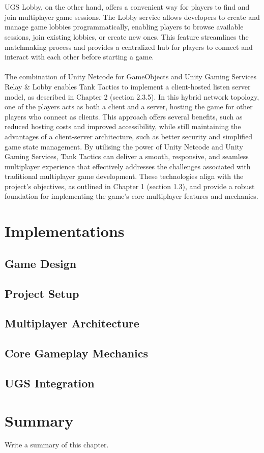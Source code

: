 \\
\noindent
\\
UGS Lobby, on the other hand, offers a convenient way for players to find and join multiplayer game sessions. The Lobby service allows developers to create and manage game lobbies programmatically, enabling players to browse available sessions, join existing lobbies, or create new ones. This feature streamlines the matchmaking process and provides a centralized hub for players to connect and interact with each other before starting a game.
\\
\noindent
\\
The combination of Unity Netcode for GameObjects and Unity Gaming Services Relay \& Lobby enables Tank Tactics to implement a client-hosted listen server model, as described in Chapter 2 (section 2.3.5). In this hybrid network topology, one of the players acts as both a client and a server, hosting the game for other players who connect as clients. This approach offers several benefits, such as reduced hosting costs and improved accessibility, while still maintaining the advantages of a client-server architecture, such as better security and simplified game state management. By utilising the power of Unity Netcode and Unity Gaming Services, Tank Tactics can deliver a smooth, responsive, and seamless multiplayer experience that effectively addresses the challenges associated with traditional multiplayer game development. These technologies align with the project's objectives, as outlined in Chapter 1 (section 1.3), and provide a robust foundation for implementing the game's core multiplayer features and mechanics.

\section{Implementations}

\subsection{Game Design}

\subsection{Project Setup}

\subsection{Multiplayer Architecture}

\subsection{Core Gameplay Mechanics}

\subsection{UGS Integration}


\section{Summary}
Write a summary of this chapter.

